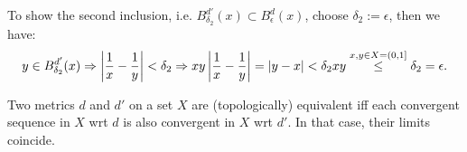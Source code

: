 \begin{exmp}
	To show the second inclusion, i.e. $B_{\delta_2}^{d'}(x) \subset B_{\epsilon}^{d}(x)$, choose $\delta_2 := \epsilon$, then we have:
	\begin{align}
		y \in B_{\delta_2}^{d'}(x) \Rightarrow \left\vert \frac{1}{x} - \frac{1}{y} \right\vert < \delta_2 \Rightarrow xy\left\vert \frac{1}{x} - \frac{1}{y} \right\vert = \left\vert y - x \right\vert < \delta_2 xy \overset{x, y\in X = (0, 1]}{\leq} \delta_2 = \epsilon.
	\end{align}
\end{exmp}

\begin{theorem}
	Two metrics $d$ and $d'$ on a set $X$ are (topologically) equivalent iff each convergent sequence in $X$ wrt $d$ is also convergent in $X$ wrt $d'$. In that case, their limits coincide.
\end{theorem}

